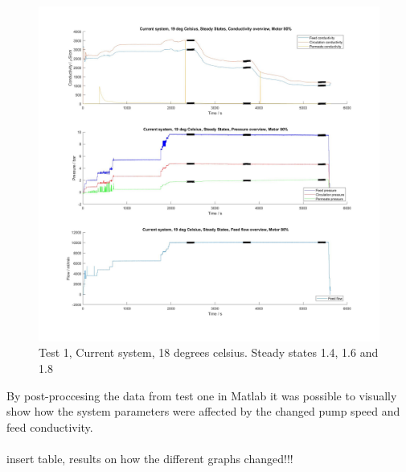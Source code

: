 \begin{figure}[H]
    \centering
    \includegraphics[width=1.1\textwidth]{overview20_80}
    \caption{Test 1, Current system, 18 degrees celsius. Steady states 1.4, 1.6 and 1.8}
    \label{fig:overw2080}
\end{figure}

\newpage

By post-proccesing the data from test one in Matlab it was possible to visually show how the system parameters were affected by the changed pump speed and feed conductivity. \\
\\

insert table, results on how the different graphs changed!!!

